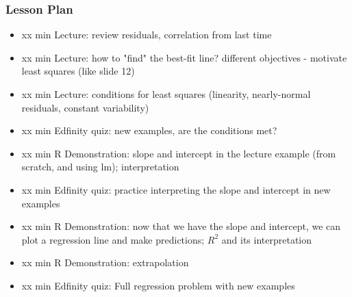 \begin{frame}
    \frametitle{Lesson Plan}
    \begin{itemize}
        \item xx min Lecture: review residuals, correlation from last time
        \item xx min Lecture: how to "find" the best-fit line? different objectives - motivate least squares (like slide 12)
        \item xx min Lecture: conditions for least squares (linearity, nearly-normal residuals, constant variability)
        \item xx min Edfinity quiz: new examples, are the conditions met?
        \item xx min R Demonstration: slope and intercept in the lecture example (from scratch, and using lm); interpretation
        \item xx min Edfinity quiz: practice interpreting the slope and intercept in new examples
        \item xx min R Demonstration: now that we have the slope and intercept, we can plot a regression line and make predictions; $R^2$ and its interpretation
        \item xx min R Demonstration: extrapolation
        \item xx min Edfinity quiz: Full regression problem with new examples
    \end{itemize}
\end{frame}

